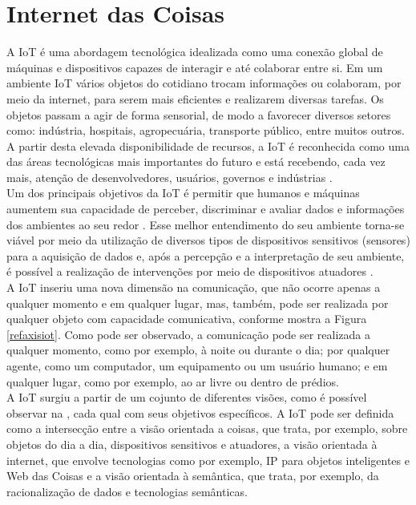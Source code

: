 \section{Internet das Coisas}%
\label{sec:internetofthings}
\quad
A \acrlong{IoT} é uma abordagem tecnológica idealizada como uma conexão global
de máquinas e dispositivos capazes de interagir e até colaborar entre si. Em um ambiente \acrshort{IoT} vários objetos do cotidiano trocam informações
ou colaboram, por meio da internet, para serem mais eficientes e realizarem diversas tarefas.
Os objetos passam a agir de forma sensorial, de modo a favorecer diversos setores como:
indústria, hospitais, agropecuária, transporte público, entre muitos outros. A partir desta
elevada disponibilidade de recursos, a \acrshort{IoT} é reconhecida como uma das áreas tecnológicas mais importantes
do futuro e está recebendo, cada vez mais, atenção de desenvolvedores, usuários, governos e indústrias \cite{giusto}.
\\ \null
\quad
Um dos principais objetivos da \acrlong{IoT} é permitir
que humanos e máquinas aumentem sua capacidade de perceber, discriminar e avaliar dados e informações dos ambientes ao seu redor \cite{IOTS}.
 Esse melhor entendimento do seu ambiente torna-se viável por meio da utilização
 de diversos tipos de dispositivos sensitivos (sensores) para a aquisição de dados e, após a percepção e a interpretação
 de seu ambiente, é possível a realização de intervenções por meio de dispositivos atuadores \cite{IOTV}.  \\\null
 \quad A \acrshort{IoT}
 inseriu uma nova dimensão na comunicação, que não ocorre apenas a qualquer momento e em qualquer lugar, mas, também, pode ser realizada por qualquer objeto
 com capacidade comunicativa, conforme mostra a Figura \ref{refaxisiot}. Como pode ser observado, a comunicação pode ser realizada a qualquer momento, como por exemplo, à noite ou durante o dia; por qualquer agente, como um computador, um equipamento ou um usuário humano; e em qualquer lugar, como por exemplo, ao ar livre ou dentro de prédios.
\\ \null
 \quad
 A \acrlong{IoT} surgiu a partir de um cojunto de diferentes visões, como é possível observar na  , cada qual com seus objetivos específicos. A \acrshort{IoT} pode ser definida como a intersecção entre a visão orientada a coisas, que trata, por exemplo, sobre objetos do dia a dia, dispositivos sensitivos e atuadores, a visão orientada à internet, que envolve tecnologias como por exemplo, IP para objetos inteligentes e Web das Coisas e a visão orientada à semântica, que trata, por exemplo, da racionalização de dados e tecnologias semânticas.
 \pagebreak
